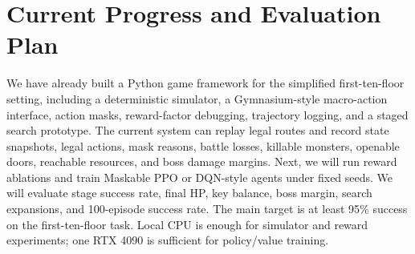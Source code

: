 \documentclass{article}
\begin{document}
\section{Current Progress and Evaluation Plan}
We have already built a Python game framework for the simplified first-ten-floor setting, including a deterministic simulator, a Gymnasium-style macro-action interface, action masks, reward-factor debugging, trajectory logging, and a staged search prototype. The current system can replay legal routes and record state snapshots, legal actions, mask reasons, battle losses, killable monsters, openable doors, reachable resources, and boss damage margins. Next, we will run reward ablations and train Maskable PPO or DQN-style agents under fixed seeds. We will evaluate stage success rate, final HP, key balance, boss margin, search expansions, and 100-episode success rate. The main target is at least 95\% success on the first-ten-floor task. Local CPU is enough for simulator and reward experiments; one RTX 4090 is sufficient for policy/value training.
\end{document}
